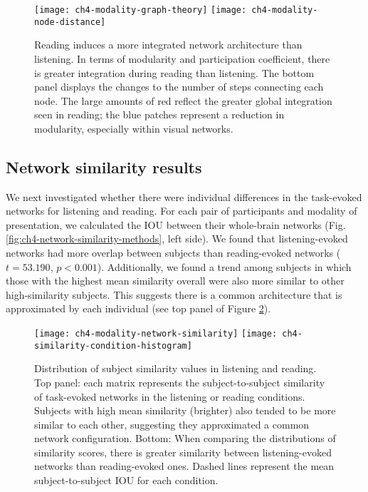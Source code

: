 \begin{figure}[t!]
	\centering
	\texttt{[image: ch4-modality-graph-theory]}
	\texttt{[image: ch4-modality-node-distance]}
    \caption[Reading induces a more integrated network architecture than listening]{Reading induces a more integrated network architecture than listening. In terms of modularity and participation coefficient, there is greater integration during reading than listening. The bottom panel displays the changes to the number of steps connecting each node. The large amounts of red reflect the greater global integration seen in reading; the blue patches represent a reduction in modularity, especially within visual networks.}
	\label{fig:ch4-modality-graph-theory}
\end{figure}


\subsection{Network similarity results}

We next investigated whether there were individual differences in the task-evoked networks for listening and reading. For each pair of participants and modality of presentation, we calculated the IOU between their whole-brain networks (Fig. \ref{fig:ch4-network-similarity-methods}, left side). We found that listening-evoked networks had more overlap between subjects than reading-evoked networks ($t = 53.190$, $p < 0.001$). Additionally, we found a trend among subjects in which those with the highest mean similarity overall were also more similar to other high-similarity subjects. This suggests there is a common architecture that is approximated by each individual (see top panel of Figure \ref{fig:ch4-modality-network-similarity}).

\begin{figure}[t!]
	\centering
	\texttt{[image: ch4-modality-network-similarity]}
	\texttt{[image: ch4-similarity-condition-histogram]}
    \caption[Network similarity across subjects in listening and reading.] {Distribution of subject similarity values in listening and reading. Top panel: each matrix represents the subject-to-subject similarity of task-evoked networks in the listening or reading conditions. Subjects with high mean similarity (brighter) also tended to be more similar to each other, suggesting they approximated a common network configuration. Bottom: When comparing the distributions of similarity scores, there is greater similarity between listening-evoked networks than reading-evoked ones. Dashed lines represent the mean subject-to-subject IOU for each condition. }
	\label{fig:ch4-modality-network-similarity}
\end{figure}

